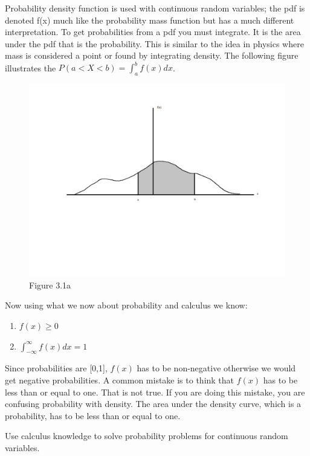\documentclass[]{book}
\providecommand{\tightlist}{%
  \setlength{\itemsep}{0pt}\setlength{\parskip}{0pt}}
\theoremstyle{definition}
\theoremstyle{definition}
\theoremstyle{definition}
\theoremstyle{remark}
\begin{document}
Probability density function is used with continuous random variables;
the pdf is denoted f(x) much like the probability mass function but has
a much different interpretation. To get probabilities from a pdf you
must integrate. It is the area under the pdf that is the probability.
This is similar to the idea in physics where mass is considered a point
or found by integrating density. The following figure illustrates the
\(P(a<X<b)=\int_{a}^{b}f(x)dx\).

\begin{figure}
\centering
\includegraphics{./images/Less14a.png}
\caption{Figure 3.1a}
\end{figure}

Now using what we now about probability and calculus we know:

\begin{enumerate}
\def\labelenumi{\arabic{enumi}.}
\tightlist
\item
  \(f(x) \geq 0\)
\item
  \(\int_{-\infty}^{\infty}f(x)dx=1\)
\end{enumerate}

Since probabilities are {[}0,1{]}, \(f(x)\) has to be non-negative
otherwise we would get negative probabilities. A common mistake is to
think that \(f(x)\) has to be less than or equal to one. That is not
true. If you are doing this mistake, you are confusing probability with
density. The area under the density curve, which is a probability, has
to be less than or equal to one.

Use calculus knowledge to solve probability problems for continuous
random variables.
\end{document}
